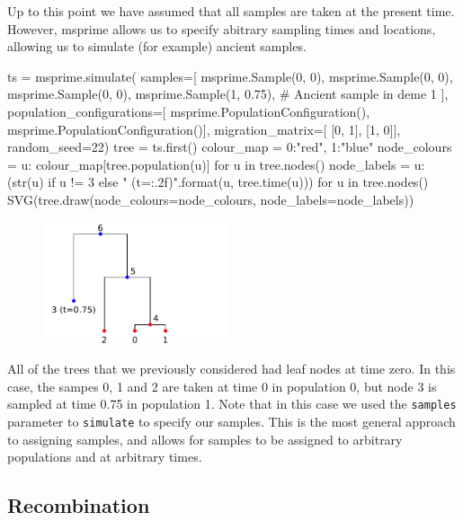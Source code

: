 \documentclass[graybox]{svmult}
\newcommand{\includenbimage}[1]{\begin{center}\texttt{[image: \#1]}\end{center}}
\begin{document}
Up to this point we have assumed that all samples are taken at the
present time. However, msprime allows us to specify abitrary sampling
times and locations, allowing us to simulate (for example) ancient
samples.

\begin{pythoncode}
ts = msprime.simulate(
    samples=[
        msprime.Sample(0, 0), msprime.Sample(0, 0), msprime.Sample(0, 0),
        msprime.Sample(1, 0.75), # Ancient sample in deme 1
    ],
    population_configurations=[
        msprime.PopulationConfiguration(),
        msprime.PopulationConfiguration()],
    migration_matrix=[
        [0, 1],
        [1, 0]],
    random_seed=22)
tree = ts.first()
colour_map = {0:"red", 1:"blue"}
node_colours = {u: colour_map[tree.population(u)] for u in tree.nodes()}
node_labels = {
    u: (str(u) if u != 3 else "{} (t={:.2f})".format(u, tree.time(u)))
    for u in tree.nodes()}
SVG(tree.draw(node_colours=node_colours, node_labels=node_labels))
\end{pythoncode}

\begin{figure}
  \begin{center}
    \includegraphics[width=0.48\textwidth]{images/simulations_45_0.pdf}
  \end{center}
\end{figure}

All of the trees that we previously considered had leaf nodes at time
zero. In this case, the sampes 0, 1 and 2 are taken at time 0 in
population 0, but node 3 is sampled at time 0.75 in population 1. Note
that in this case we used the \texttt{samples} parameter to
\texttt{simulate} to specify our samples. This is the most general
approach to assigning samples, and allows for samples to be assigned to
arbitrary populations and at arbitrary times.

\subsection{Recombination}\label{recombination}
\end{document}
